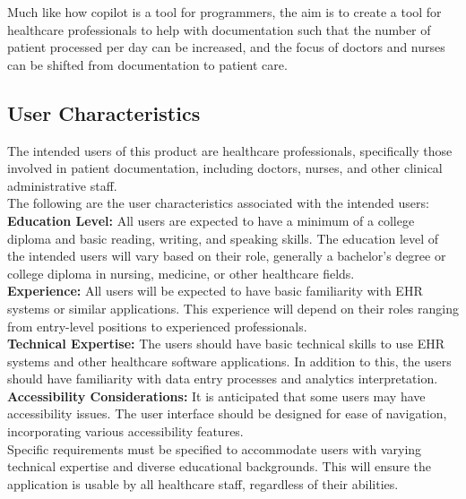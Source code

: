 \documentclass[12pt]{article}
\begin{document}
Much like how copilot is a tool for programmers, the aim is to create a tool for healthcare professionals to help with documentation such that the number of patient processed per day can be increased, and the focus of doctors and nurses can be shifted from documentation to patient care. 


\subsection{User Characteristics} \label{sec_UserCharacteristics}

The intended users of this product are healthcare professionals, specifically those involved in patient documentation, including doctors, nurses, and other clinical administrative staff. \\

The following are the user characteristics associated with the intended users:\\

\textbf{Education Level:} All users are expected to have a minimum of a college diploma and basic reading, writing, and speaking skills. The education level of the intended users will vary based on their role, generally a bachelor’s degree or college diploma in nursing, medicine, or other healthcare fields. \\

\textbf{Experience:} All users will be expected to have basic familiarity with EHR systems or similar applications. This experience will depend on their roles ranging from entry-level positions to experienced professionals. \\

\textbf{Technical Expertise:} The users should have basic technical skills to use EHR systems and other healthcare software applications. In addition to this, the users should have familiarity with data entry processes and analytics interpretation. \\

\textbf{Accessibility Considerations:} It is anticipated that some users may have accessibility issues. The user interface should be designed for ease of navigation, incorporating various accessibility features.\\

Specific requirements must be specified to accommodate users with varying technical expertise and diverse educational backgrounds. This will ensure the application is usable by all healthcare staff, regardless of their abilities.
\end{document}
